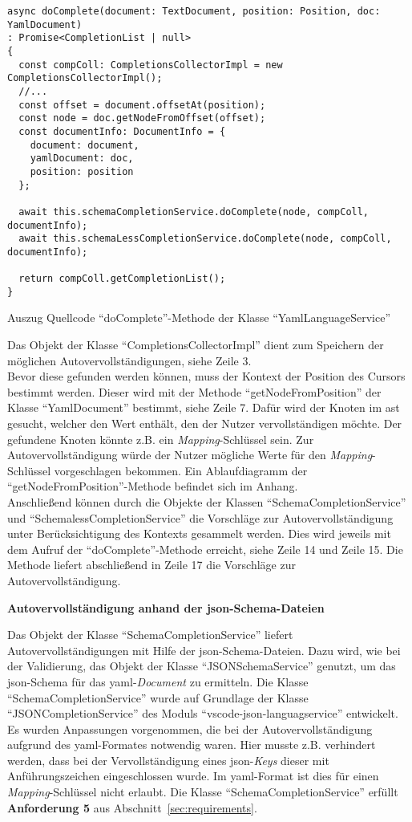 \begin{listing}[htp]
  \begin{verbatim}
async doComplete(document: TextDocument, position: Position, doc: YamlDocument)
: Promise<CompletionList | null> 
{
  const compColl: CompletionsCollectorImpl = new CompletionsCollectorImpl();
  //...
  const offset = document.offsetAt(position);
  const node = doc.getNodeFromOffset(offset);
  const documentInfo: DocumentInfo = {
    document: document,
    yamlDocument: doc,
    position: position
  };

  await this.schemaCompletionService.doComplete(node, compColl, documentInfo);
  await this.schemaLessCompletionService.doComplete(node, compColl, documentInfo);

  return compColl.getCompletionList();
}
      \end{verbatim}
  \caption{Auszug Quellcode ``doComplete''-Methode der Klasse ``YamlLanguageService''}
  \label{lst:do-complete-yaml-language-service}
\end{listing}

Das Objekt der Klasse ``CompletionsCollectorImpl'' dient zum Speichern der möglichen Autovervollständigungen, siehe Zeile 3.
\\
Bevor diese gefunden werden können, muss der Kontext der Position des Cursors bestimmt werden.
Dieser wird mit der Methode ``getNodeFromPosition'' der Klasse ``YamlDocument'' bestimmt, siehe Zeile 7.
Dafür wird der Knoten im \ac{ast} gesucht, welcher den Wert enthält, den der Nutzer vervollständigen möchte.
Der gefundene Knoten könnte z.B. ein \textit{Mapping}-Schlüssel sein.
Zur Autovervollständigung würde der Nutzer mögliche Werte für den \textit{Mapping}-Schlüssel vorgeschlagen bekommen.
Ein Ablaufdiagramm der ``getNodeFromPosition''-Methode befindet sich im Anhang.
\\
Anschließend können durch die Objekte der Klassen ``SchemaCompletionService'' und ``SchemalessCompletionService''
die Vorschläge zur Autovervollständigung unter Berücksichtigung des Kontexts gesammelt werden.
Dies wird jeweils mit dem Aufruf der ``doComplete''-Methode erreicht, siehe Zeile 14 und Zeile 15.
Die Methode liefert abschließend in Zeile 17 die Vorschläge zur Autovervollständigung.

\textbf{Autovervollständigung anhand der \ac{json}-Schema-Dateien}

Das Objekt der Klasse ``SchemaCompletionService'' liefert Autovervollständigungen mit Hilfe der \ac{json}-Schema-Dateien.
Dazu wird, wie bei der Validierung, das Objekt der Klasse ``JSONSchemaService'' genutzt, um das \ac{json}-Schema für das \ac{yaml}-\textit{Document}
zu ermitteln. Die Klasse ``SchemaCompletionService'' wurde auf Grundlage der Klasse ``JSONCompletionService'' des Moduls ``vscode-json-languagservice''
entwickelt. Es wurden Anpassungen vorgenommen, die bei der Autovervollständigung aufgrund des \ac{yaml}-Formates notwendig waren.
Hier musste z.B. verhindert werden, dass bei der Vervollständigung eines \ac{json}-\textit{Keys} dieser mit Anführungszeichen eingeschlossen wurde.
Im \ac{yaml}-Format ist dies für einen \textit{Mapping}-Schlüssel nicht erlaubt.
Die Klasse ``SchemaCompletionService'' erfüllt \textbf{Anforderung 5} aus Abschnitt~\ref{sec:requirements}.

